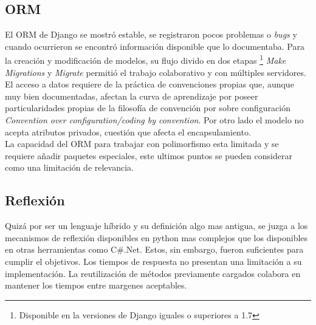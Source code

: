 \documentclass[twoside,twocolumn]{article}
\begin{document}
\subsection{ORM}
El ORM de Django se mostró estable, se registraron pocos problemas o 
\textit{bugs} y cuando ocurrieron se encontró información disponible que lo 
documentaba. Para la creación y modificación de modelos, su flujo divido en 
dos etapas \footnote{Disponible en la versiones de Django iguales o superiores 
a 1.7} \textit{Make Migrations} y \textit{Migrate} permitió el trabajo 
colaborativo y con múltiples servidores. El acceso a datos requiere de la 
práctica de convenciones propias que, aunque muy bien documentadas, afectan la 
curva de aprendizaje por poseer particularidades propias de la filosofía de convención por sobre configuración \textit{Convention over configuration/coding by convention}. 
Por otro lado el modelo no acepta atributos privados, cuestión 
que afecta el encapsulamiento.\\La capacidad del ORM para trabajar con 
polimorfismo esta limitada y se requiere añadir paquetes especiales, este ultimos puntos se pueden considerar como una limitación de relevancia.

\subsection{Reflexión}
Quizá por ser un lenguaje híbrido y su definición algo mas antigua, se 
juzga a los mecanismos de reflexión disponibles en python mas 
complejos que los disponibles en otras herramientas como C\#.Net. Estos, sin 
embargo, fueron suficientes para cumplir el objetivos. Los tiempos de respuesta 
no presentan una limitación a su implementación. La reutilización de métodos 
previamente cargados colabora en mantener los tiempos entre margenes aceptables.



\end{document}
